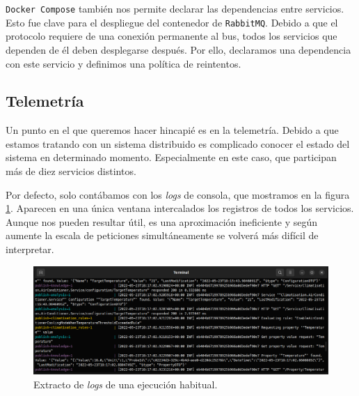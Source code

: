 \texttt{Docker Compose} también nos permite declarar las dependencias entre servicios. Esto fue clave para el despliegue del contenedor de \texttt{RabbitMQ}. Debido a que el protocolo requiere de una conexión permanente al bus\cite{johanssonPartRabbitMQBest2019}, todos los servicios que dependen de él deben desplegarse después. Por ello, declaramos una dependencia con este servicio y definimos una política de reintentos.

\subsection{Telemetría}

Un punto en el que queremos hacer hincapié es en la telemetría. Debido a que estamos tratando con un sistema distribuido es complicado conocer el estado del sistema en determinado momento. Especialmente en este caso, que participan más de diez servicios distintos.

Por defecto, solo contábamos con los \emph{logs} de consola, que mostramos en la figura \ref{fig:console-logs}. Aparecen en una única ventana intercalados los registros de todos los servicios. Aunque nos pueden resultar útil, es una aproximación ineficiente y según aumente la escala de peticiones simultáneamente se volverá más difícil de interpretar.

\begin{figure}[h]
  \centering
  \includegraphics[scale=1.45]{cap_despliegue/images/console-logs}
  \caption{Extracto de \emph{logs} de una ejecución habitual.}
  \label{fig:console-logs}
\end{figure}

